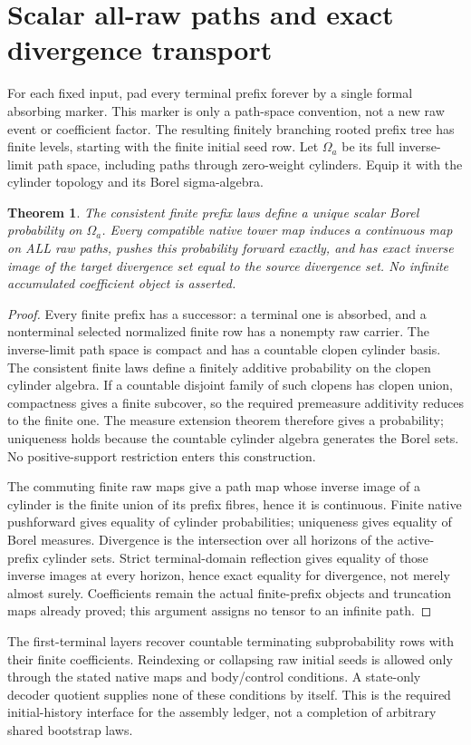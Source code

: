 \documentclass[11pt]{article}
\newtheorem{theorem}{Theorem}\newtheorem{definition}{Definition}
\begin{document}
\section{Scalar all-raw paths and exact divergence transport}
For each fixed input, pad every terminal prefix forever by a single formal
absorbing marker. This marker is only a path-space convention, not a new
raw event or coefficient factor. The resulting finitely branching rooted
prefix tree has finite levels, starting with the finite initial seed row.
Let $\Omega_a$ be its full inverse-limit path space, including paths through
zero-weight cylinders. Equip it with the cylinder topology and its Borel
sigma-algebra.
\begin{theorem}
The consistent finite prefix laws define a unique scalar Borel probability
on $\Omega_a$. Every compatible native tower map induces a continuous map
on ALL raw paths, pushes this probability forward exactly, and has exact
inverse image of the target divergence set equal to the source divergence
set. No infinite accumulated coefficient object is asserted.
\end{theorem}
\begin{proof}
Every finite prefix has a successor: a terminal one is absorbed, and a
nonterminal selected normalized finite row has a nonempty raw carrier.
The inverse-limit path space is compact and has a countable clopen cylinder
basis. The consistent finite laws define a finitely additive probability
on the clopen cylinder algebra. If a countable disjoint family of such
clopens has clopen union, compactness gives a finite subcover, so the
required premeasure additivity reduces to the finite one. The measure
extension theorem therefore gives a probability; uniqueness holds because
the countable cylinder algebra generates the Borel sets. No positive-support
restriction enters this construction.

The commuting finite raw maps give a path map whose inverse image of a
cylinder is the finite union of its prefix fibres, hence it is continuous.
Finite native pushforward gives equality of cylinder probabilities;
uniqueness gives equality of Borel measures. Divergence is the intersection
over all horizons of the active-prefix cylinder sets. Strict terminal-domain
reflection gives equality of those inverse images at every horizon, hence
exact equality for divergence, not merely almost surely. Coefficients remain
the actual finite-prefix objects and truncation maps already proved; this
argument assigns no tensor to an infinite path.
\end{proof}

The first-terminal layers recover countable terminating subprobability
rows with their finite coefficients. Reindexing or collapsing raw initial
seeds is allowed only through the stated native maps and body/control
conditions. A state-only decoder quotient supplies none of these conditions
by itself. This is the required initial-history interface for the assembly
ledger, not a completion of arbitrary shared bootstrap laws.
\end{document}
